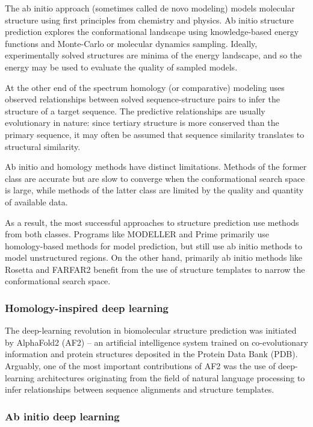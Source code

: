 \documentclass[%
 aip,
 amsmath,amssymb,
 reprint,%
]{revtex4-1}
\begin{document}
The ab initio approach (sometimes called de novo modeling) models molecular structure using first principles from chemistry and physics. Ab initio structure prediction explores the conformational landscape using knowledge-based energy functions and Monte-Carlo or molecular dynamics sampling. Ideally, experimentally solved structures are minima of the energy landscape, and so the energy may be used to evaluate the quality of sampled models.

At the other end of the spectrum homology (or comparative) modeling uses observed relationships between solved sequence-structure pairs to infer the structure of a target sequence. The predictive relationships are usually evolutionary in nature: since tertiary structure is more conserved than the primary sequence, it may often be assumed that sequence similarity translates to structural similarity.

Ab initio and homology methods have distinct limitations. Methods of the former class are accurate but are slow to converge when the conformational search space is large, while methods of the latter class are limited by the quality and quantity of available data.

As a result, the most successful approaches to structure prediction use methods from both classes. Programs like MODELLER and Prime primarily use homology-based methods for model prediction, but still use ab initio methods to model unstructured regions. On the other hand, primarily ab initio methods like Rosetta and FARFAR2 benefit from the use of structure templates to narrow the conformational search space.

\subsubsection{Homology-inspired deep learning}

The deep-learning revolution in biomolecular structure prediction was initiated by AlphaFold2 (AF2) -- an artificial intelligence system trained on co-evolutionary information and protein structures deposited in the Protein Data Bank (PDB). Arguably, one of the most important contributions of AF2 was the use of deep-learning architectures originating from the field of natural language processing to infer relationships between sequence alignments and structure templates.



\subsubsection{Ab initio deep learning}
\end{document}
